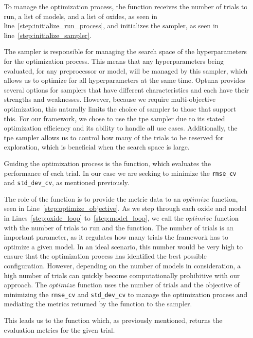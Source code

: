 To manage the optimization process, the function receives the number of trials to run, a list of models, and a list of oxides, as seen in line~\ref{step:initialize_run_process}, and initializes the sampler, as seen in line~\ref{step:initialize_sampler}.

The sampler is responsible for managing the search space of the hyperparameters for the optimization process.
This means that any hyperparameters being evaluated, for any preprocessor or model, will be managed by this sampler, which allows us to optimize for all hyperparameters at the same time.
Optuna provides several options for samplers that have different characteristics and each have their strengths and weaknesses.
However, because we require multi-objective optimization, this naturally limits the choice of sampler to those that support this.
For our framework, we chose to use the \gls{tpe} sampler due to its stated optimization efficiency and its ability to handle all use cases.
Additionally, the \gls{tpe} sampler allows us to control how many of the trials to be reserved for exploration, which is beneficial when the search space is large\cite{optuna_2019}.

Guiding the optimization process is the  function, which evaluates the performance of each trial.
In our case we are seeking to minimize the \texttt{rmse\_cv} and \texttt{std\_dev\_cv}, as mentioned previously.

The role of the  function is to provide the metric data to an $optimize$ function, seen in Line~\ref{step:optimize_objective}.
As we step through each oxide and model in Lines~\ref{step:oxide_loop} to~\ref{step:model_loop}, we call the $optimize$ function with the number of trials to run and the  function.
The number of trials is an important parameter, as it regulates how many trials the framework has to optimize a given model.
In an ideal scenario, this number would be very high to ensure that the optimization process has identified the best possible configuration.
However, depending on the number of models in consideration, a high number of trials can quickly become computationally prohibitive with our approach.
The $optimize$ function uses the number of trials and the objective of minimizing the \texttt{rmse\_cv} and \texttt{std\_dev\_cv} to manage the optimization process and mediating the metrics returned by the  function to the sampler. 

This leads us to the  function which, as previously mentioned, returns the evaluation metrics for the given trial.

